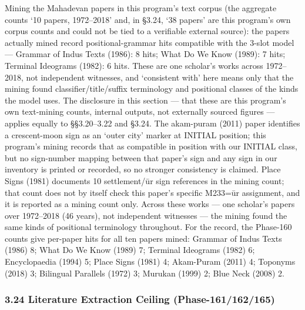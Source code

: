 \documentclass[
]{article}
\begin{document}
Mining the Mahadevan papers in this program's text corpus (the aggregate counts `10 papers, 1972--2018' and, in §3.24, `38 papers' are this program's own corpus counts and could not be tied to a verifiable external source): the papers actually mined record positional-grammar hits compatible with the 3-slot model --- Grammar of Indus Texts (1986): 8 hits; What Do We Know (1989): 7 hits; Terminal Ideograms (1982): 6 hits. These are one scholar's works across 1972--2018, not independent witnesses, and `consistent with' here means only that the mining found classifier/title/suffix terminology and positional classes of the kinds the model uses. The disclosure in this section --- that these are this program's own text-mining counts, internal outputs, not externally sourced figures --- applies equally to §§3.20--3.22 and §3.24. The akam-puram (2011) paper identifies a crescent-moon sign as an `outer city' marker at INITIAL position; this program's mining records that as compatible in position with our INITIAL class, but no sign-number mapping between that paper's sign and any sign in our inventory is printed or recorded, so no stronger consistency is claimed. Place Signs (1981) documents 10 settlement/ūr sign references in the mining count; that count does not by itself check this paper's specific M233=ūr assignment, and it is reported as a mining count only. Across these works --- one scholar's papers over 1972--2018 (46 years), not independent witnesses --- the mining found the same kinds of positional terminology throughout. For the record, the Phase-160 counts give per-paper hits for all ten papers mined: Grammar of Indus Texts (1986) 8; What Do We Know (1989) 7; Terminal Ideograms (1982) 6; Encyclopaedia (1994) 5; Place Signs (1981) 4; Akam-Puram (2011) 4; Toponyms (2018) 3; Bilingual Parallels (1972) 3; Murukan (1999) 2; Blue Neck (2008) 2.

\subsubsection{3.24 Literature Extraction Ceiling
(Phase-161/162/165)}\label{literature-extraction-ceiling-phase-161162165}
\end{document}

